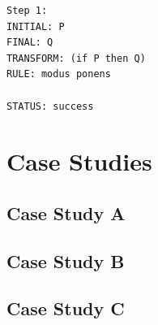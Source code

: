 \documentclass{l4proj}
\begin{document}
\begin{appendices}
\begin{verbatim}
Step 1: 
INITIAL: P
FINAL: Q
TRANSFORM: (if P then Q)
RULE: modus ponens

STATUS: success
\end{verbatim}

\chapter{Case Studies}
\section{Case Study A}
\label{casestudyA}

\section{Case Study B}
\label{casestudyB}

\section{Case Study C}
\label{casestudyC}


\end{appendices}




\end{document}
